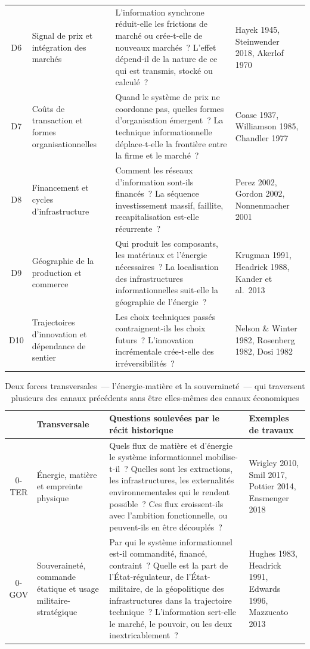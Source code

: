 \begin{table}[htbp]
\begin{tabularx}{\textwidth}{@{}cp{3.2cm}Xp{3.8cm}@{}}
D6 & Signal de prix et intégration des marchés & L'information synchrone réduit-elle les frictions de marché ou crée-t-elle de nouveaux marchés~? L'effet dépend-il de la nature de ce qui est transmis, stocké ou calculé~? & Hayek 1945, Steinwender 2018, Akerlof 1970 \\[4pt]
D7 & Coûts de transaction et formes organisationnelles & Quand le système de prix ne coordonne pas, quelles formes d'organisation émergent~? La technique informationnelle déplace-t-elle la frontière entre la firme et le marché~? & Coase 1937, Williamson 1985, Chandler 1977 \\[4pt]
D8 & Financement et cycles d'infrastructure & Comment les réseaux d'information sont-ils financés~? La séquence investissement massif, faillite, recapitalisation est-elle récurrente~? & Perez 2002, Gordon 2002, Nonnenmacher 2001 \\[4pt]
D9 & Géographie de la production et commerce & Qui produit les composants, les matériaux et l'énergie nécessaires~? La localisation des infrastructures informationnelles suit-elle la géographie de l'énergie~? & Krugman 1991, Headrick 1988, Kander et al.\ 2013 \\[4pt]
D10 & Trajectoires d'innovation et dépendance de sentier & Les choix techniques passés contraignent-ils les choix futurs~? L'innovation incrémentale crée-t-elle des irréversibilités~? & Nelson \& Winter 1982, Rosenberg 1982, Dosi 1982 \\
\bottomrule
\end{tabularx}
\end{table}

\begin{table}[htbp]
\caption{Deux forces transversales~--- l'énergie-matière et la souveraineté~--- qui traversent plusieurs des canaux précédents sans être elles-mêmes des canaux économiques}\label{tab:transversales}
\centering\small
\begin{tabularx}{\textwidth}{@{}cp{3.2cm}Xp{3.8cm}@{}}
\toprule
 & \textbf{Transversale} & \textbf{Questions soulevées par le récit historique} & \textbf{Exemples de travaux} \\
\midrule
0-TER & Énergie, matière et empreinte physique & Quels flux de matière et d'énergie le système informationnel mobilise-t-il~? Quelles sont les extractions, les infrastructures, les externalités environnementales qui le rendent possible~? Ces flux croissent-ils avec l'ambition fonctionnelle, ou peuvent-ils en être découplés~? & Wrigley 2010, Smil 2017, Pottier 2014, Ensmenger 2018 \\[4pt]
0-GOV & Souveraineté, commande étatique et usage militaire-stratégique & Par qui le système informationnel est-il commandité, financé, contraint~? Quelle est la part de l'État-régulateur, de l'État-militaire, de la géopolitique des infrastructures dans la trajectoire technique~? L'information sert-elle le marché, le pouvoir, ou les deux inextricablement~? & Hughes 1983, Headrick 1991, Edwards 1996, Mazzucato 2013 \\
\bottomrule
\end{tabularx}
\end{table}

